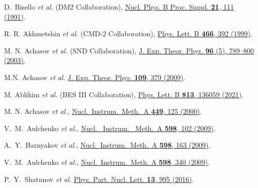 \documentclass[twocolumn,aps,prd,floatfix,nofootinbib,superscriptaddress]{revtex4-2}
\begin{document}
\begin{thebibliography}{9}
D.~Bisello \textit{et al.} (DM2 Collaboration),
\href{https://doi.org/10.1016/0920-5632(91)90244-9}
{Nucl. Phys. B Proc. Suppl. \textbf{21}, 111 (1991)}.

R. R. Akhmetshin \emph{et al.} (CMD-2 Collaboration),
\href{https://doi.org/10.1016/S0370-2693(99)01080-1}
{Phys. Lett. B \textbf{466}, 392 (1999)}.

M. N. Achasov \emph{et al.} (SND Collaboration),
\href{https://doi.org/10.1134/1.1581933}
{J. Exp. Theor. Phys. \textbf{96} (5), 789--800 (2003)}.

M.N. Achasov \emph{et al.}
\href{https://doi.org/10.1134/S1063776109090039}
{J. Exp. Theor. Phys. \textbf{109}, 379 (2009)}.

M. Ablikim \emph{et al.} (BES III Collaboration),
\href{https://doi.org/10.1016/j.physletb.2020.136059}{Phys. Lett. B \textbf{813}, 136059 (2021)}.

M. N. Achasov \emph{et al.},
\href{http://dx.doi.org/10.1016/S0168-9002(99)01302-9}
{Nucl.\ Instrum.\ Meth.\ A {\bf 449}, 125 (2000)}.

V.~M.~Aulchenko \textit{et al.},
\href{http://dx.doi.org/10.1016/\-j.nima.2008.08.099}
{Nucl. \ Instrum. \ Meth.\ A {\bf 598}, 102 (2009)}.

A.~Y.~Barnyakov \textit{et al.},
\href{http://dx.doi.org/10.1016/\-j.nima.2008.08.018}
{Nucl.\ Instrum.\ Meth.\ A {\bf 598}, 163 (2009)}.

V.~M.~Aulchenko \textit{et al.},
\href{http://dx.doi.org/10.1016/\-j.nima.2008.08.127}
{Nucl.\ Instrum.\ Meth. A {\bf 598}, 340 (2009)}.

P.~Y.~Shatunov \textit{et al.}
\href{https://doi.org/10.1134/S154747711607044X}
{Phys. Part. Nucl. Lett. \textbf{13}, 995 (2016)}.


\end{thebibliography}
\end{document}

